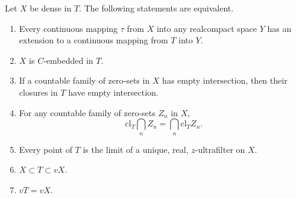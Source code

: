 Let $X$ be dense in $T$. The following statements are equivalent.
\begin{enumerate}
\item[(1)] Every continuous mapping $\tau$ from $X$ into any realcompact space $Y$ has an extension to a continuous mapping from $T$ into $Y$.
\item[(2)] $X$ is $C$-embedded in $T$.
\item[(3)] If a countable family of zero-sets in $X$ has empty intersection, then their closures in $T$ have empty intersection.
\item[(4)] For any countable family of zero-sets $Z_n$ in $X$,
  $$\mathrm{cl}_T \bigcap_n Z_n = \bigcap_n \mathrm{cl}_T Z_n.$$
\item[(5)] Every point of $T$ is the limit of a unique, real, $z$-ultrafilter on $X$.
\item[(6)] $X \subset T \subset vX$.
\item[(7)] $vT = vX$.
\end{enumerate}

